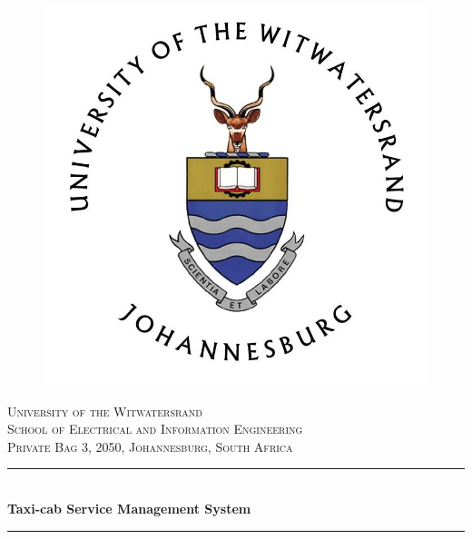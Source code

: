 \documentclass[12pt]{article}
\begin{document}
\begin{titlepage}

\newcommand{\HRule}{\rule{\linewidth}{0.5mm}} %

\center %
 
\begin{figure}
\centering
\includegraphics[scale=0.3]{wits-logo.jpg}
\end{figure}

\textsc{\LARGE University of the Witwatersrand}\\[0.5cm]
\textsc{\Large School of Electrical and Information Engineering}\\[0.5cm]
\textsc{\small Private Bag 3, 2050, Johannesburg, South Africa}\\[0.5cm]


\HRule \\[0.5cm]
{ \huge \bfseries Taxi-cab Service Management System}\\ %
\HRule \\[0.5cm]
 

\end{titlepage}
\end{document}
